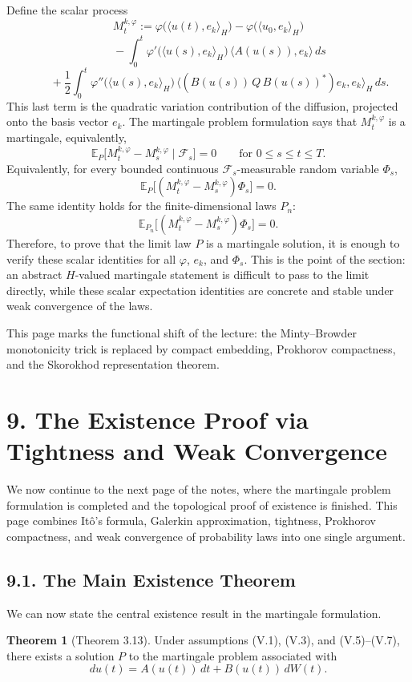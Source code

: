 \documentclass[11pt]{article}
\theoremstyle{definition}
\newtheorem{theorem}{Theorem}
\theoremstyle{remark}
\begin{document}
Define the scalar process
\[
  M_t^{k,\varphi}:=\varphi\bigl(\langle u(t),e_k\rangle_H\bigr)-\varphi\bigl(\langle u_0,e_k\rangle_H\bigr)
\]
\[
  \qquad -\int_0^t \varphi'\bigl(\langle u(s),e_k\rangle_H\bigr)\,\langle A(u(s)),e_k\rangle\,ds
\]
\[
  \qquad +\frac12\int_0^t \varphi''\bigl(\langle u(s),e_k\rangle_H\bigr)\,
  \bigl\langle (B(u(s))\,Q\,B(u(s))^*)e_k,e_k\bigr\rangle_H\,ds.
\]
This last term is the quadratic variation contribution of the diffusion, projected onto the basis vector $e_k$. The martingale problem formulation says that $M_t^{k,\varphi}$ is a martingale, equivalently,
\[
  \mathbb E_P\bigl[M_t^{k,\varphi}-M_s^{k,\varphi}\mid \mathcal F_s\bigr]=0
  \qquad \text{for } 0\le s\le t\le T.
\]
Equivalently, for every bounded continuous $\mathcal F_s$-measurable random variable $\Phi_s$,
\[
  \mathbb E_P\bigl[(M_t^{k,\varphi}-M_s^{k,\varphi})\Phi_s\bigr]=0.
\]
The same identity holds for the finite-dimensional laws $P_n$:
\[
  \mathbb E_{P_n}\bigl[(M_t^{k,\varphi}-M_s^{k,\varphi})\Phi_s\bigr]=0.
\]
Therefore, to prove that the limit law $P$ is a martingale solution, it is enough to verify these scalar identities for all $\varphi$, $e_k$, and $\Phi_s$. This is the point of the section: an abstract $H$-valued martingale statement is difficult to pass to the limit directly, while these scalar expectation identities are concrete and stable under weak convergence of the laws.

This page marks the functional shift of the lecture: the Minty--Browder monotonicity trick is replaced by compact embedding, Prokhorov compactness, and the Skorokhod representation theorem.

\section*{9. The Existence Proof via Tightness and Weak Convergence}
We now continue to the next page of the notes, where the martingale problem formulation is completed and the topological proof of existence is finished. This page combines It\^o's formula, Galerkin approximation, tightness, Prokhorov compactness, and weak convergence of probability laws into one single argument.
\subsection*{9.1. The Main Existence Theorem}
We can now state the central existence result in the martingale formulation.

\begin{theorem}[Theorem 3.13]
Under assumptions (V.1), (V.3), and (V.5)--(V.7), there exists a solution $P$ to the martingale problem associated with
\[
  du(t)=A(u(t))\,dt+B(u(t))\,dW(t).
\]
\end{theorem}
\end{document}
